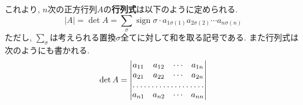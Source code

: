 \documentclass[a4j,dvipdfmx]{jsarticle}
\numberwithin{equation}{section}
\newcommand{\sign}{\mathop{\mathrm{sign}}\nolimits}
\begin{document}
            これより, $n$次の正方行列$A$の\textbf{行列式}は以下のように定められる.
            \begin{equation}
                |A|=\det A = \sum_{\sigma}\sign\sigma \cdot a_{1\sigma(1)}a_{2\sigma(2)}\cdots a_{n\sigma(n)} \label{eq:線形代数:行列式の定義}
            \end{equation}
            ただし, $\sum\limits_{\sigma}$は考えられる置換$\sigma$全てに対して和を取る記号である. また行列式は次のようにも書かれる.
            \begin{equation}
                \det A = \begin{vmatrix}
                    a_{11} & a_{12} & \cdots & a_{1n} \\
                    a_{21} & a_{22} & \cdots & a_{2n} \\
                    \hdotsfor{4}\\
                    a_{n1} & a_{n2} & \cdots & a_{nn}
                \end{vmatrix} \label{eq:線形代数:行列式の表記}
            \end{equation}
\end{document}
